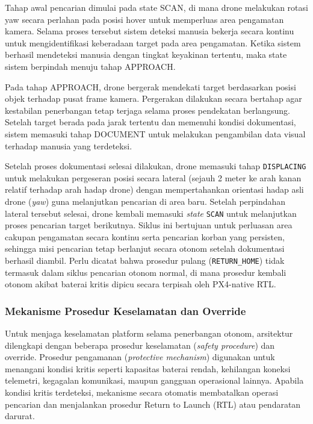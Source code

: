 Tahap awal pencarian dimulai pada state SCAN, di mana drone melakukan rotasi yaw secara perlahan pada posisi hover untuk memperluas area pengamatan kamera. Selama proses tersebut sistem deteksi manusia bekerja secara kontinu untuk mengidentifikasi keberadaan target pada area pengamatan. Ketika sistem berhasil mendeteksi manusia dengan tingkat keyakinan tertentu, maka state sistem berpindah menuju tahap APPROACH.

Pada tahap APPROACH, drone bergerak mendekati target berdasarkan posisi objek terhadap pusat frame kamera. Pergerakan dilakukan secara bertahap agar kestabilan penerbangan tetap terjaga selama proses pendekatan berlangsung. Setelah target berada pada jarak tertentu dan memenuhi kondisi dokumentasi, sistem memasuki tahap DOCUMENT untuk melakukan pengambilan data visual terhadap manusia yang terdeteksi.

Setelah proses dokumentasi selesai dilakukan, drone memasuki tahap \texttt{DISPLACING} untuk melakukan pergeseran posisi secara lateral (sejauh 2 meter ke arah kanan relatif terhadap arah hadap drone) dengan mempertahankan orientasi hadap asli drone (\textit{yaw}) guna melanjutkan pencarian di area baru. Setelah perpindahan lateral tersebut selesai, drone kembali memasuki \textit{state} \texttt{SCAN} untuk melanjutkan proses pencarian target berikutnya. Siklus ini bertujuan untuk perluasan area cakupan pengamatan secara kontinu serta pencarian korban yang persisten, sehingga misi pencarian tetap berlanjut secara otonom setelah dokumentasi berhasil diambil. Perlu dicatat bahwa prosedur pulang (\texttt{RETURN\_HOME}) tidak termasuk dalam siklus pencarian otonom normal, di mana prosedur kembali otonom akibat baterai kritis dipicu secara terpisah oleh PX4-native RTL.

\subsubsection{Mekanisme Prosedur Keselamatan dan Override}
Untuk menjaga keselamatan platform selama penerbangan otonom, arsitektur dilengkapi dengan beberapa prosedur keselamatan (\textit{safety procedure}) dan override. Prosedur pengamanan (\textit{protective mechanism}) digunakan untuk menangani kondisi kritis seperti kapasitas baterai rendah, kehilangan koneksi telemetri, kegagalan komunikasi, maupun gangguan operasional lainnya. Apabila kondisi kritis terdeteksi, mekanisme secara otomatis membatalkan operasi pencarian dan menjalankan prosedur Return to Launch (RTL) atau pendaratan darurat.

